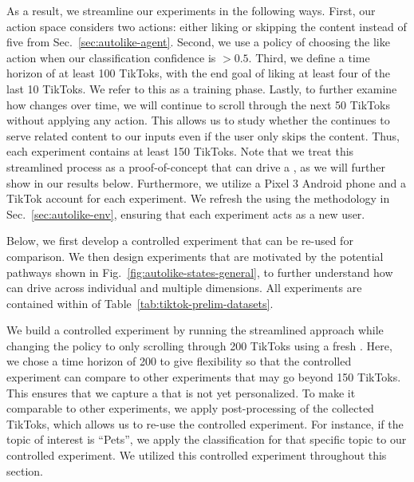 As a result, we streamline our \autolike{} experiments in the following ways. First, our action space considers two actions: either liking or skipping the content instead of five from Sec.~\ref{sec:autolike-agent}. Second, we use a policy of choosing the like action when our classification confidence is $> 0.5$. Third, we define a time horizon of at least 100 TikToks, with the end goal of liking at least four of the last 10 TikToks. We refer to this as a training phase. Lastly, to further examine how \rs{} changes over time, we will continue to scroll through the next 50 TikToks without applying any action. This allows us to study whether the \rs{} continues to serve related content to our inputs even if the user only skips the content. Thus, each experiment contains at least 150 TikToks. Note that we treat this streamlined process as a proof-of-concept that \autolike{} can drive a \rs{}, as we will further show in our results below.
Furthermore, we utilize a Pixel 3 Android phone and a TikTok account for each experiment. We refresh the \fyp{} using the methodology in Sec.~\ref{sec:autolike-env}, ensuring that each experiment acts as a new user. 

Below, we first develop a controlled experiment that can be re-used for comparison. We then design experiments that are motivated by the potential pathways shown in Fig.~\ref{fig:autolike-states-general}, to further understand how \autolike{} can drive \rs{} across individual and multiple dimensions. 
All experiments are contained within \autolikedatasettwo{} of Table~\ref{tab:tiktok-prelim-datasets}.


We build a controlled experiment by running the streamlined approach while changing the policy to only scrolling through 200 TikToks using a fresh \fyp{}. Here, we chose a time horizon of 200 to give flexibility so that the controlled experiment can compare to other experiments that may go beyond 150 TikToks. This ensures that we capture a \fyp{} that is not yet personalized. 
To make it comparable to other experiments, we apply post-processing of the collected TikToks, which allows us to re-use the controlled experiment. For instance, if the topic of interest is ``Pets'', we apply the classification for that specific topic to our controlled experiment. We utilized this controlled experiment throughout this section.



